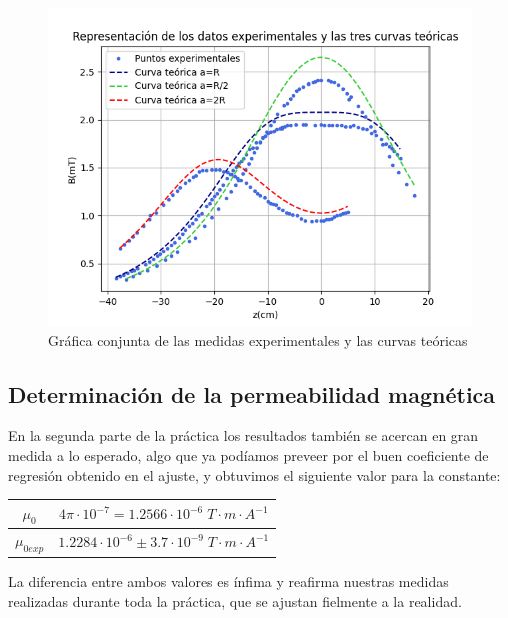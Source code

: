 \documentclass[a4paper,12pt,titlepage]{article}
\begin{document}
\begin{figure}[h!]
    \centering
    \includegraphics[width=0.95\linewidth]{Images/Tres curvas.png}
    \caption{Gráfica conjunta de las medidas experimentales y las curvas teóricas}
\end{figure}

\newpage

\subsection{Determinación de la permeabilidad magnética}

En la segunda parte de la práctica los resultados también se acercan en gran medida a lo esperado, algo que ya podíamos preveer por el buen coeficiente de regresión obtenido en el ajuste, y obtuvimos el siguiente valor para la constante:
\begin{table}[h!]
    \centering
    \begin{tabular}{c|c}
            $\mu_0$ & $4\pi\cdot 10^{-7} = 1.2566 \cdot 10^{-6} \; T \cdot m \cdot A^{-1}$ \\ \hline
            $\mu_{0exp}$ & $1.2284 \cdot 10^{-6} \pm 3.7 \cdot 10^{-9} \; T \cdot m \cdot A^{-1}$
    \end{tabular}
\end{table}

La diferencia entre ambos valores es ínfima y reafirma nuestras medidas realizadas durante toda la práctica, que se ajustan fielmente a la realidad.
\end{document}
